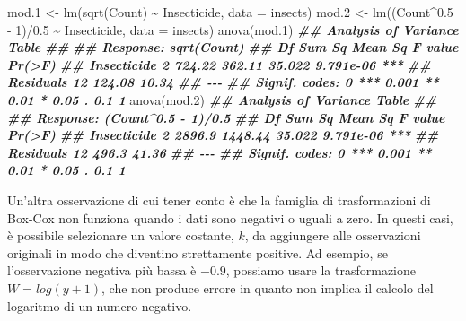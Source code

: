 \documentclass[
  12pt,
]{book}
\newenvironment{Shaded}{\begin{snugshade}}{\end{snugshade}}
\newcommand{\AttributeTok}[1]{\textcolor[rgb]{0.77,0.63,0.00}{#1}}
\newcommand{\DecValTok}[1]{\textcolor[rgb]{0.00,0.00,0.81}{#1}}
\newcommand{\DocumentationTok}[1]{\textcolor[rgb]{0.56,0.35,0.01}{\textbf{\textit{#1}}}}
\newcommand{\FloatTok}[1]{\textcolor[rgb]{0.00,0.00,0.81}{#1}}
\newcommand{\FunctionTok}[1]{\textcolor[rgb]{0.00,0.00,0.00}{#1}}
\newcommand{\NormalTok}[1]{#1}
\newcommand{\OtherTok}[1]{\textcolor[rgb]{0.56,0.35,0.01}{#1}}
\newcommand{\SpecialCharTok}[1]{\textcolor[rgb]{0.00,0.00,0.00}{#1}}
\begin{document}
\begin{Shaded}
\begin{Highlighting}[]
\NormalTok{mod}\FloatTok{.1} \OtherTok{\textless{}{-}} \FunctionTok{lm}\NormalTok{(}\FunctionTok{sqrt}\NormalTok{(Count) }\SpecialCharTok{\textasciitilde{}}\NormalTok{ Insecticide, }\AttributeTok{data =}\NormalTok{ insects)}
\NormalTok{mod}\FloatTok{.2} \OtherTok{\textless{}{-}} \FunctionTok{lm}\NormalTok{((Count}\SpecialCharTok{\^{}}\FloatTok{0.5} \SpecialCharTok{{-}} \DecValTok{1}\NormalTok{)}\SpecialCharTok{/}\FloatTok{0.5} \SpecialCharTok{\textasciitilde{}}\NormalTok{ Insecticide, }\AttributeTok{data =}\NormalTok{ insects)}
\FunctionTok{anova}\NormalTok{(mod}\FloatTok{.1}\NormalTok{)}
\DocumentationTok{\#\# Analysis of Variance Table}
\DocumentationTok{\#\# }
\DocumentationTok{\#\# Response: sqrt(Count)}
\DocumentationTok{\#\#             Df Sum Sq Mean Sq F value    Pr(\textgreater{}F)    }
\DocumentationTok{\#\# Insecticide  2 724.22  362.11  35.022 9.791e{-}06 ***}
\DocumentationTok{\#\# Residuals   12 124.08   10.34                      }
\DocumentationTok{\#\# {-}{-}{-}}
\DocumentationTok{\#\# Signif. codes:  0 \textquotesingle{}***\textquotesingle{} 0.001 \textquotesingle{}**\textquotesingle{} 0.01 \textquotesingle{}*\textquotesingle{} 0.05 \textquotesingle{}.\textquotesingle{} 0.1 \textquotesingle{} \textquotesingle{} 1}
\FunctionTok{anova}\NormalTok{(mod}\FloatTok{.2}\NormalTok{)}
\DocumentationTok{\#\# Analysis of Variance Table}
\DocumentationTok{\#\# }
\DocumentationTok{\#\# Response: (Count\^{}0.5 {-} 1)/0.5}
\DocumentationTok{\#\#             Df Sum Sq Mean Sq F value    Pr(\textgreater{}F)    }
\DocumentationTok{\#\# Insecticide  2 2896.9 1448.44  35.022 9.791e{-}06 ***}
\DocumentationTok{\#\# Residuals   12  496.3   41.36                      }
\DocumentationTok{\#\# {-}{-}{-}}
\DocumentationTok{\#\# Signif. codes:  0 \textquotesingle{}***\textquotesingle{} 0.001 \textquotesingle{}**\textquotesingle{} 0.01 \textquotesingle{}*\textquotesingle{} 0.05 \textquotesingle{}.\textquotesingle{} 0.1 \textquotesingle{} \textquotesingle{} 1}
\end{Highlighting}
\end{Shaded}

Un'altra osservazione di cui tener conto è che la famiglia di trasformazioni di Box-Cox non funziona quando i dati sono negativi o uguali a zero. In questi casi, è possibile selezionare un valore costante, \(k\), da aggiungere alle osservazioni originali in modo che diventino strettamente positive. Ad esempio, se l'osservazione negativa più bassa è \(-0.9\), possiamo usare la trasformazione \(W = log(y + 1)\), che non produce errore in quanto non implica il calcolo del logaritmo di un numero negativo.
\end{document}
